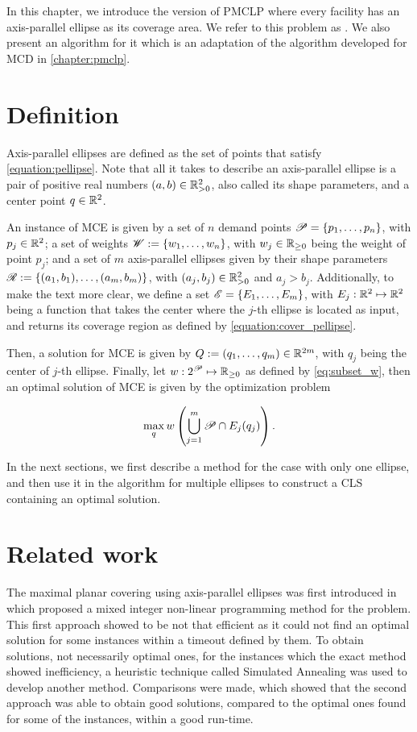 In this chapter, we introduce the version of PMCLP where every 
facility has an axis-parallel ellipse as its coverage area. We refer to this problem as . We also present an algorithm for it which is an adaptation of the algorithm developed for MCD in \autoref{chapter:pmclp}.

\section{Definition}

Axis-parallel ellipses are defined as the set of points that satisfy \autoref{equation:pellipse}. Note that all it takes to describe an axis-parallel ellipse is a pair of positive real numbers $(a,b) \in \mathbb{R}_{>0}^2$, also called its shape parameters, and a center point $q \in \mathbb{R}^2$.

An instance of MCE is given by a set of $n$ demand points $\mathscr{P} = \{p_1, \dots, p_n\}$, with $p_j\in\mathbb{R}^2$; 
a set of weights $\mathscr{W}:=\{w_1, \dots, w_n\}$, with $w_j\in\mathbb{R}_{\ge0}$ being the weight of point $p_j$;
and a set of $m$ axis-parallel ellipses given by their shape parameters $\mathscr{R}:=\{(a_1, b_1), \dots, (a_m, b_m)\}$, with $(a_j, b_j)\in\mathbb{R}_{>0}^2$ and $a_j>b_j$.
Additionally, to make the text more clear, we define a set $\mathscr{E} = \{E_1, \dots, E_m\}$, with $E_j : \mathbb{R}^2 \mapsto \mathbb{R}^2$ being a function that takes the center where the $j$-th ellipse is located as input, and returns its coverage region as defined by \autoref{equation:cover_pellipse}.

Then, a solution for MCE is given by $Q:=(q_1, \dots, q_m)\in\mathbb{R}^{2m}$, with $q_j$ being the center of $j$-th ellipse. Finally, let $w : 2^{\mathscr{P}} \mapsto \mathbb{R}_{\ge0}$ as defined by \autoref{eq:subset_w}, then an optimal solution of MCE is given by the optimization problem

\begin{equation*}
\max_q w\left(\bigcup_{j=1}^m \mathscr{P} \cap E_j(q_j)\right).
\end{equation*}

In the next sections, we first describe a method for the case with only one ellipse, and then use it in the algorithm for multiple ellipses to construct a CLS containing an optimal solution.

\section{Related work}
The maximal planar covering using axis-parallel ellipses was first introduced in  which proposed a mixed integer non-linear programming method for the problem. This first approach showed to be not that efficient as it could not find an optimal solution for some instances within a timeout defined by them. To obtain solutions, not necessarily optimal ones, for the instances which the exact method showed inefficiency, a heuristic technique called Simulated Annealing was used to develop another method. Comparisons were made, which showed that the second approach was able to obtain good solutions, compared to the optimal ones found for some of the instances, within a good run-time.

